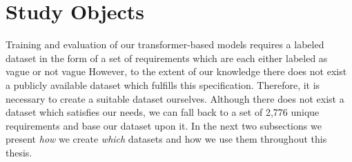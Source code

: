 \section{Study Objects}
\label{chp:study:sec:study_objects}

Training and evaluation of our transformer-based models requires a labeled dataset in the form of a set of requirements which are each either labeled as vague or not vague
However, to the extent of our knowledge there does not exist a publicly available dataset which fulfills this specification.
Therefore, it is necessary to create a suitable dataset ourselves.
Although there does not exist a dataset which satisfies our needs, we can fall back to a set of 2,776 unique requirements \parencite{Kummeth:2020} and base our dataset upon it.
In the next two subsections we present \textit{how} we create \textit{which} datasets and how we use them throughout this thesis.



